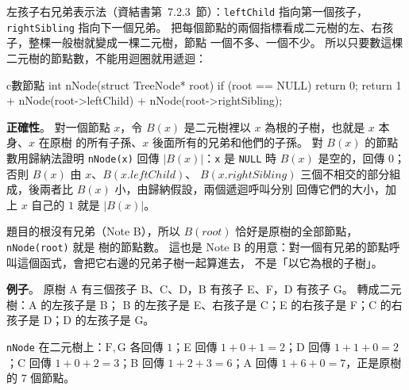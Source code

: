 \begin{pastsoln}
左孩子右兄弟表示法（資結書第~7.2.3~節）：\texttt{leftChild} 指向第一個孩子，\texttt{rightSibling}
指向下一個兄弟。 把每個節點的兩個指標看成二元樹的左、右孩子，整棵一般樹就變成一棵二元樹，節點
一個不多、一個不少。 所以只要數這棵二元樹的節點數，不能用迴圈就用遞迴：
\begin{code}{c}{數節點}
int nNode(struct TreeNode* root){
    if (root == NULL)
        return 0;
    return 1 + nNode(root->leftChild) + nNode(root->rightSibling);
}
\end{code}

\textbf{正確性}。 對一個節點 $x$，令 $B(x)$ 是二元樹裡以 $x$ 為根的子樹，也就是 $x$ 本身、$x$ 在原樹
的所有子孫、$x$ 後面所有的兄弟和他們的子孫。 對 $B(x)$ 的節點數用歸納法證明 \texttt{nNode(x)} 回傳
$|B(x)|$：\texttt{x} 是 \texttt{NULL} 時 $B(x)$ 是空的，回傳 $0$；否則 $B(x)$ 由 $x$、$B(x.\mathit{leftChild})$、
$B(x.\mathit{rightSibling})$ 三個不相交的部分組成，後兩者比 $B(x)$ 小，由歸納假設，兩個遞迴呼叫分別
回傳它們的大小，加上 $x$ 自己的 $1$ 就是 $|B(x)|$。

題目的根沒有兄弟（Note B），所以 $B(\mathit{root})$ 恰好是原樹的全部節點，\texttt{nNode(root)} 就是
樹的節點數。 這也是 Note B 的用意：對一個有兄弟的節點呼叫這個函式，會把它右邊的兄弟子樹一起算進去，
不是「以它為根的子樹」。

\textbf{例子}。 原樹 A 有三個孩子 B、C、D，B 有孩子 E、F，D 有孩子 G。 轉成二元樹：A 的左孩子是 B；
B 的左孩子是 E、右孩子是 C；E 的右孩子是 F；C 的右孩子是 D；D 的左孩子是 G。
\begin{center}
\end{center}
\texttt{nNode} 在二元樹上：$\mathrm{F}, \mathrm{G}$ 各回傳 $1$；E 回傳 $1 + 0 + 1 = 2$；D 回傳
$1 + 1 + 0 = 2$；C 回傳 $1 + 0 + 2 = 3$；B 回傳 $1 + 2 + 3 = 6$；A 回傳 $1 + 6 + 0 = 7$，正是原樹的
$7$ 個節點。


\end{pastsoln}
